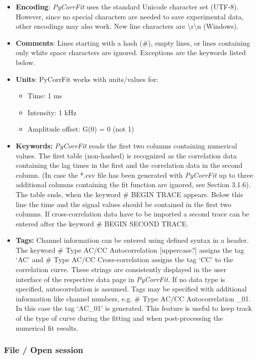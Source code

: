 \begin{itemize}
\item \textbf{Encoding}: \textit{PyCorrFit} uses the standard Unicode character set (UTF-8). However, since no special characters are needed to save experimental data, other encodings may also work. New line characters are {\textbackslash}r{\textbackslash}n (Windows).
\item \textbf{Comments}: Lines starting with a hash (\#), empty lines, or lines containing only white space characters are ignored. Exceptions are the keywords listed below.
\item \textbf{Units}: PyCorrFit works with units/values for:

\begin{itemize}
\item Time: 1 ms
\item Intensity: 1 kHz
\item Amplitude offset: G(0) = 0 (not 1)
\end{itemize}
\item \textbf{Keywords: }\textit{PyCorrFit} reads the first two columns containing numerical values. The first table (non-hashed) is recognized as the correlation data containing the lag times in the first and the correlation data in the second column. (In case the *.csv file has been generated with \textit{PyCorrFit} up to three additional columns containing the fit function are ignored, see Section 3.1.6). The table ends, when the keyword \# BEGIN TRACE appears. Below this line the time and the signal values should be contained in the first two columns. If cross-correlation data have to be imported a second trace can be entered after the keyword \# BEGIN SECOND TRACE.
\item \textbf{Tags:} Channel information can be entered using defined syntax in a header. The keyword \# Type AC/CC Autocorrelation [uppercase?] assigns the tag ‘AC’ and \# Type AC/CC Cross-correlation assigns the tag ‘CC’ to the correlation curve. These strings are consistently displayed in the user interface of the respective data page in \textit{PyCorrFit}. If no data type is specified, autocorrelation is assumed. Tags may be specified with additional information like channel numbers, e.g. \# Type AC/CC Autocorrelation \_01. In this case the tag ‘AC\_01’ is generated. This feature is useful to keep track of the type of curve during the fitting and when post-processing the numerical fit results.
\end{itemize}

\subsubsection{File / Open session}

